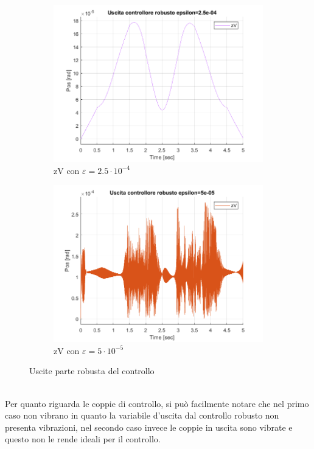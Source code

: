 \begin{figure}[!ht]
	\begin{subfigure}{.53\textwidth}
		\centering
		\includegraphics[width=.8\linewidth]{Immagini/Traiettorie/epsilon25uscita}  
		\caption{zV con $\varepsilon = 2.5\cdot 10^{-4}$ }
		\label{fig:rob1}
	\end{subfigure}
	\begin{subfigure}{.53\textwidth}
		\centering
		\includegraphics[width=.8\linewidth]{Immagini/Traiettorie/epsilon5uscita}  
		\caption{zV con $\varepsilon = 5\cdot 10^{-5}$}
		\label{fig:rob2}
	\end{subfigure}
	\caption{Uscite parte robusta del controllo}
\end{figure}
\\Per quanto riguarda le coppie di controllo, si può facilmente notare che nel primo caso non vibrano in quanto la variabile d'uscita dal controllo robusto non presenta vibrazioni, nel secondo caso invece le coppie in uscita sono vibrate e questo non le rende ideali per il controllo.

